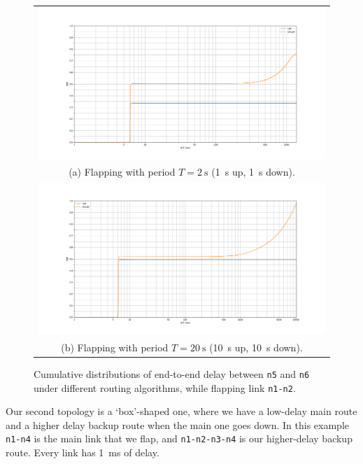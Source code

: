 \documentclass[10pt,twoside,a4paper]{article}
\begin{document}
\begin{figure}
\begin{tabular}{c}
  \includegraphics[width=190mm]{fig_partition_flap1} \\
  (a) Flapping with period $T=\SI{2}{\s}$ (\SI{1}{\s} up, \SI{1}{\s} down). \\ [6pt]
  \includegraphics[width=190mm]{fig_partition_flap10} \\
  (b) Flapping with period $T=\SI{20}{\s}$ (\SI{10}{\s} up, \SI{10}{\s} down). \\[6pt]
\end{tabular}
\caption{Cumulative distributions of end-to-end delay between \texttt{n5} and \texttt{n6} under different routing algorithms, while flapping link \texttt{n1-n2}.}
\end{figure}

\pagebreak


Our second topology is a `box'-shaped one, where we have a low-delay main route and a higher delay backup route when the main one goes down. In this example \texttt{n1-n4} is the main link that we flap, and \texttt{n1-n2-n3-n4} is our higher-delay backup route. Every link has \SI{1}{\ms} of delay.
\end{document}
